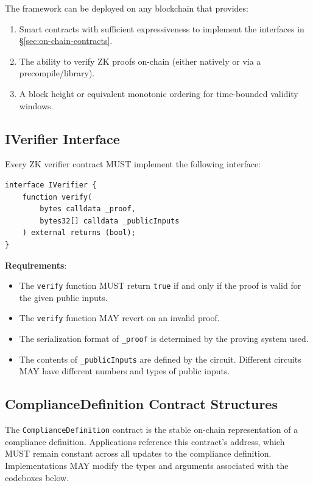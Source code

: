 \documentclass[9pt]{extreport}
\begin{document}
The framework can be deployed on any blockchain that provides:

\begin{enumerate}
    \item Smart contracts with sufficient expressiveness to implement the interfaces in \S\ref{sec:on-chain-contracts}.
    \item The ability to verify ZK proofs on-chain (either natively or via a precompile/library).
    \item A block height or equivalent monotonic ordering for time-bounded validity windows.
\end{enumerate}

\subsection{IVerifier Interface}
\label{sec:iverifier}

Every ZK verifier contract MUST implement the following interface:

\begin{singlespace}
\begin{lstlisting}[language=Solidity]
interface IVerifier {
    function verify(
        bytes calldata _proof,
        bytes32[] calldata _publicInputs
    ) external returns (bool);
}
\end{lstlisting}
\end{singlespace}

\textbf{Requirements}:
\begin{itemize}
    \item The \texttt{verify} function MUST return \texttt{true} if and only if the proof is valid for the given public inputs.
    \item The \texttt{verify} function MAY revert on an invalid proof.
    \item The serialization format of \texttt{\_proof} is determined by the proving system used.
    \item The contents of \texttt{\_publicInputs} are defined by the circuit. Different circuits MAY have different numbers and types of public inputs.
\end{itemize}

\subsection{ComplianceDefinition Contract Structures}
\label{sec:compliancedefinition-contract}

The \texttt{ComplianceDefinition} contract is the stable on-chain representation of a compliance definition. Applications reference this contract's address, which MUST remain constant across all updates to the compliance definition.  Implementations MAY modify the types and arguments associated with the codeboxes below.
\end{document}
